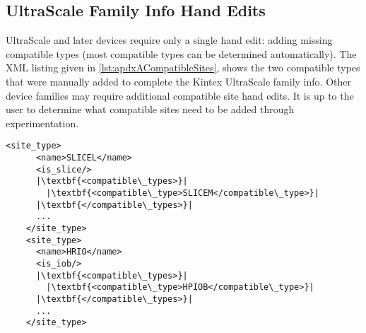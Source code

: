 \subsection{UltraScale Family Info Hand Edits} \label{sec:ultrascaleHandEdits}

UltraScale and later devices require only a single hand edit: adding 
missing compatible types (most compatible types can be determined
automatically). The XML listing given in \autoref{lst:apdxACompatibleSites},
shows the two compatible types that were manually added to complete the Kintex
UltraScale family info. Other device families may require additional compatible
site hand edits. It is up to the user to determine what compatible sites need
to be added through experimentation.

\begin{lstlisting}[numbers=none, caption=Manually added compatible sites for
UltraScale devices, label=lst:apdxACompatibleSites] 
    <site_type>
      <name>SLICEL</name>
      <is_slice/>
      |\textbf{<compatible\_types>}|
        |\textbf{<compatible\_type>SLICEM</compatible\_type>}|
      |\textbf{</compatible\_types>}|
      ...
    </site_type>
    <site_type>
      <name>HRIO</name> 
      <is_iob/>
      |\textbf{<compatible\_types>}|
        |\textbf{<compatible\_type>HPIOB</compatible\_type>}|
      |\textbf{</compatible\_types>}|
      ...
    </site_type>
\end{lstlisting}  